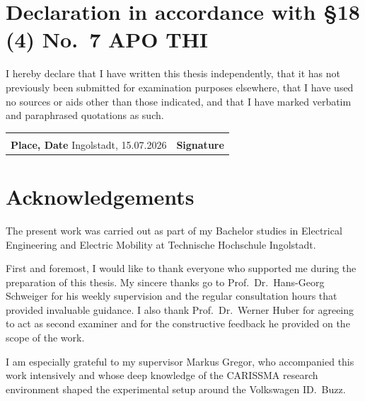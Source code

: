 \documentclass[11pt,a4paper,oneside,parskip=half]{scrreprt}
\begin{document}
\chapter*{Declaration in accordance with \S18 (4) No.~7 APO THI}
\thispagestyle{plain}

\noindent I hereby declare that I have written this thesis independently, that it has not previously been submitted for examination purposes elsewhere, that I have used no sources or aids other than those indicated, and that I have marked verbatim and paraphrased quotations as such.

\vspace{2.5cm}

\noindent
\begin{tabular}{@{}p{7cm}p{7cm}@{}}
\hrulefill & \hrulefill \\[-2pt]
\textbf{Place, Date} \hfill Ingolstadt, 15.07.2026 & \textbf{Signature} \\
\end{tabular}

\chapter*{Acknowledgements}
\thispagestyle{plain}

The present work was carried out as part of my Bachelor studies in Electrical Engineering and Electric Mobility at Technische Hochschule Ingolstadt.

First and foremost, I would like to thank everyone who supported me during the preparation of this thesis. My sincere thanks go to Prof.\ Dr.\ Hans-Georg Schweiger for his weekly supervision and the regular consultation hours that provided invaluable guidance. I also thank Prof.\ Dr.\ Werner Huber for agreeing to act as second examiner and for the constructive feedback he provided on the scope of the work.

I am especially grateful to my supervisor Markus Gregor, who accompanied this work intensively and whose deep knowledge of the CARISSMA research environment shaped the experimental setup around the Volkswagen ID.~Buzz.
\end{document}
